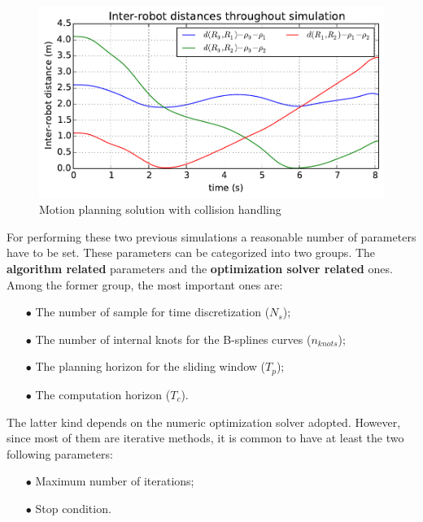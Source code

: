 \documentclass[eprint]{actapoly}
\begin{document}
\begin{figure}
  \includegraphics[width=\linewidth]{./images/no_collision/multirobot-interr.pdf} %
  \caption{Motion planning solution with collision handling\label{fig:nocollision}}
\label{fig:res}
\end{figure}

For performing these two previous simulations a reasonable number of parameters have to be set. These parameters can be categorized into two groups. The \textbf{algorithm related} parameters and the \textbf{optimization solver related} ones.
Among the former group, the most important ones are:
\begin{itemize}
\item[$\bullet$] The number of sample for time discretization ($N_s$);
\item[$\bullet$] The number of internal knots for the B-splines curves ($n_{knots}$);
\item[$\bullet$] The planning horizon for the sliding window ($T_p$);
\item[$\bullet$] The computation horizon ($T_c$).
\end{itemize}

The latter kind depends on the numeric optimization solver adopted.
However, since most of them are iterative methods, it is common
to have at least the two following parameters:
\begin{itemize}
\item[$\bullet$] Maximum number of iterations;
\item[$\bullet$] Stop condition.
\end{itemize}

\end{document}
